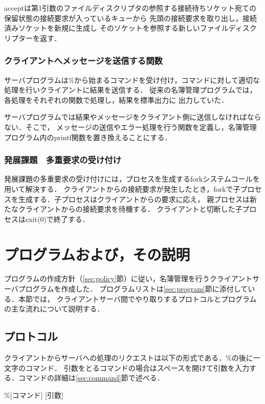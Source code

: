 \documentclass[11pt]{jarticle}
\begin{document}
acceptは第1引数のファイルディスクリプタの参照する接続待ちソケット宛ての
保留状態の接続要求が入っているキューから
先頭の接続要求を取り出し，接続済みソケットを新規に生成し
そのソケットを参照する新しいファイルディスクリプターを返す．

\subsubsection{クライアントへメッセージを送信する関数} \label{sec:response}

サーバプログラムは\%から始まるコマンドを受け付け，コマンドに対して適切な処理を行いクライアントに結果を送信する．
従来の名簿管理プログラムでは，各処理をそれぞれの関数で処理し，結果を標準出力に
出力していた．

サーバプログラムでは結果やメッセージをクライアント側に送信しなければならない．そこで，
メッセージの送信やエラー処理を行う関数を定義し，名簿管理プログラム内のprintf関数を置き換えることにする．

\subsubsection{発展課題　多重要求の受け付け}

発展課題の多重要求の受け付けには，プロセスを生成するforkシステムコールを用いて解決する．
クライアントからの接続要求が発生したとき，forkで子プロセスを生成する．子プロセスはクライアントからの要求に応え，
親プロセスは新たなクライアントからの接続要求を待機する．
クライアントと切断した子プロセスはexit(0)で終了する．

\section{プログラムおよび，その説明}

プログラムの作成方針（\ref{sec:policy}節）に従い，名簿管理を行うクライアントサーバプログラムを作成した．
プログラムリストは\ref{sec:program}節に添付している．本節では，
クライアントサーバ間でやり取りするプロトコルとプログラムの主な流れについて説明する．

\subsection{プロトコル}

クライアントからサーバへの処理のリクエストは以下の形式である．\%の後に一文字のコマンド．
引数をとるコマンドの場合はスペースを開けて引数を入力する．コマンドの詳細は\ref{sec:command}節で述べる．
\begin{center}
    \%[コマンド] [引数]
\end{center}
\end{document}

